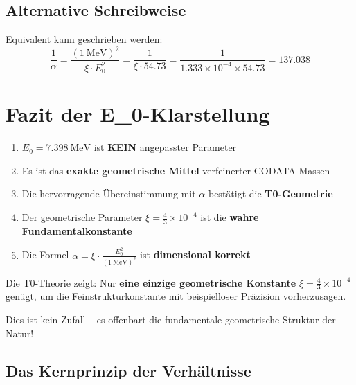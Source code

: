 	\subsection{Alternative Schreibweise}
	
	Equivalent kann geschrieben werden:
	\begin{equation}
		\frac{1}{\alpha} = \frac{( \SI{1}{\MeV} )^2}{\xi \cdot E_0^2} = \frac{1}{\xi \cdot 54.73} = \frac{1}{1.333 \times 10^{-4} \times 54.73} = 137.038
	\end{equation}
	
	\section{Fazit der E\_0-Klarstellung}
	
	\begin{tcolorbox}[colback=red!5!white,colframe=red!75!black,title=Zusammenfassung E\_0-Analyse]
		\begin{enumerate}
			\item $E_0 = \SI{7.398}{\MeV}$ ist \textbf{KEIN} angepasster Parameter
			\item Es ist das \textbf{exakte geometrische Mittel} verfeinerter CODATA-Massen
			\item Die hervorragende Übereinstimmung mit $\alpha$ bestätigt die \textbf{T0-Geometrie}
			\item Der geometrische Parameter $\xi = \frac{4}{3} \times 10^{-4}$ ist die \textbf{wahre Fundamentalkonstante}
			\item Die Formel $\alpha = \xi \cdot \frac{E_0^2}{( \SI{1}{\MeV} )^2}$ ist \textbf{dimensional korrekt}
		\end{enumerate}
	\end{tcolorbox}
	
	\begin{tcolorbox}[colback=green!10!white,colframe=green!75!black,title=Die Revolutionäre E\_0-Erkenntnis]
		Die T0-Theorie zeigt: Nur \textbf{eine einzige geometrische Konstante} $\xi = \frac{4}{3} \times 10^{-4}$ genügt, um die Feinstrukturkonstante mit beispielloser Präzision vorherzusagen.
		
		Dies ist kein Zufall -- es offenbart die fundamentale geometrische Struktur der Natur!
	\end{tcolorbox}
	
	\subsection{Das Kernprinzip der Verhältnisse}
	
